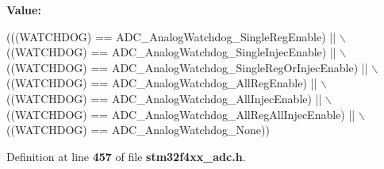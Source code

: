 {\bfseries Value\+:}
\begin{DoxyCode}
(((WATCHDOG) == ADC_AnalogWatchdog_SingleRegEnable) || \(\backslash\)
                                          ((WATCHDOG) == 
      ADC_AnalogWatchdog_SingleInjecEnable) || \(\backslash\)
                                          ((WATCHDOG) == 
      ADC_AnalogWatchdog_SingleRegOrInjecEnable) || \(\backslash\)
                                          ((WATCHDOG) == 
      ADC_AnalogWatchdog_AllRegEnable) || \(\backslash\)
                                          ((WATCHDOG) == 
      ADC_AnalogWatchdog_AllInjecEnable) || \(\backslash\)
                                          ((WATCHDOG) == 
      ADC_AnalogWatchdog_AllRegAllInjecEnable) || \(\backslash\)
                                          ((WATCHDOG) == ADC_AnalogWatchdog_None))
\end{DoxyCode}


Definition at line \textbf{ 457} of file \textbf{ stm32f4xx\+\_\+adc.\+h}.

